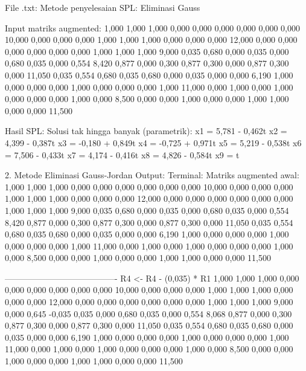 \documentclass[12pt]{article}
\begin{document}
\begin{enumerate}
\begin{keluaran}
File .txt:
Metode penyelesaian SPL: Eliminasi Gauss

Input matriks augmented:
1,000	1,000	1,000	0,000	0,000	0,000	0,000	0,000	0,000	10,000
0,000	0,000	0,000	1,000	1,000	1,000	0,000	0,000	0,000	12,000
0,000	0,000	0,000	0,000	0,000	0,000	1,000	1,000	1,000	9,000
0,035	0,680	0,000	0,035	0,000	0,680	0,035	0,000	0,554	8,420
0,877	0,000	0,300	0,877	0,300	0,000	0,877	0,300	0,000	11,050
0,035	0,554	0,680	0,035	0,680	0,000	0,035	0,000	0,000	6,190
1,000	0,000	0,000	0,000	1,000	0,000	0,000	0,000	1,000	11,000
0,000	1,000	0,000	1,000	0,000	0,000	0,000	1,000	0,000	8,500
0,000	0,000	1,000	0,000	0,000	1,000	1,000	0,000	0,000	11,500

Hasil SPL:
Solusi tak hingga banyak (parametrik):
x1 = 5,781 - 0,462t
x2 = 4,399 - 0,387t
x3 = -0,180 + 0,849t
x4 = -0,725 + 0,971t
x5 = 5,219 - 0,538t
x6 = 7,506 - 0,433t
x7 = 4,174 - 0,416t
x8 = 4,826 - 0,584t
x9 = t

2. Metode Eliminasi Gauss-Jordan
Output:
Terminal:
Matriks augmented awal:
1,000   1,000   1,000   0,000   0,000   0,000   0,000   0,000   0,000   10,000
0,000   0,000   0,000   1,000   1,000   1,000   0,000   0,000   0,000   12,000
0,000   0,000   0,000   0,000   0,000   0,000   1,000   1,000   1,000   9,000
0,035   0,680   0,000   0,035   0,000   0,680   0,035   0,000   0,554   8,420
0,877   0,000   0,300   0,877   0,300   0,000   0,877   0,300   0,000   11,050
0,035   0,554   0,680   0,035   0,680   0,000   0,035   0,000   0,000   6,190
1,000   0,000   0,000   0,000   1,000   0,000   0,000   0,000   1,000   11,000
0,000   1,000   0,000   1,000   0,000   0,000   0,000   1,000   0,000   8,500
0,000   0,000   1,000   0,000   0,000   1,000   1,000   0,000   0,000   11,500

----------------------------------------
R4 <- R4 - (0,035) * R1
1,000   1,000   1,000   0,000   0,000   0,000   0,000   0,000   0,000   10,000
0,000   0,000   0,000   1,000   1,000   1,000   0,000   0,000   0,000   12,000
0,000   0,000   0,000   0,000   0,000   0,000   1,000   1,000   1,000   9,000
0,000   0,645   -0,035  0,035   0,000   0,680   0,035   0,000   0,554   8,068
0,877   0,000   0,300   0,877   0,300   0,000   0,877   0,300   0,000   11,050
0,035   0,554   0,680   0,035   0,680   0,000   0,035   0,000   0,000   6,190
1,000   0,000   0,000   0,000   1,000   0,000   0,000   0,000   1,000   11,000
0,000   1,000   0,000   1,000   0,000   0,000   0,000   1,000   0,000   8,500
0,000   0,000   1,000   0,000   0,000   1,000   1,000   0,000   0,000   11,500


\end{keluaran}
\end{enumerate}
\end{document}
